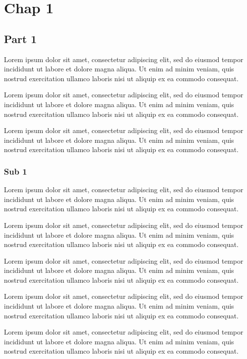 \documentclass[twoside]{report}
\begin{document}
\tableofcontents
\chapter{Chap 1}
\section{Part 1}
Lorem ipsum dolor sit amet, consectetur adipiscing elit, sed do eiusmod tempor incididunt ut labore et dolore magna aliqua. Ut enim ad minim veniam, quis nostrud exercitation ullamco laboris nisi ut aliquip ex ea commodo consequat.

Lorem ipsum dolor sit amet, consectetur adipiscing elit, sed do eiusmod tempor incididunt ut labore et dolore magna aliqua. Ut enim ad minim veniam, quis nostrud exercitation ullamco laboris nisi ut aliquip ex ea commodo consequat.

Lorem ipsum dolor sit amet, consectetur adipiscing elit, sed do eiusmod tempor incididunt ut labore et dolore magna aliqua. Ut enim ad minim veniam, quis nostrud exercitation ullamco laboris nisi ut aliquip ex ea commodo consequat.

\subsection{Sub 1}
Lorem ipsum dolor sit amet, consectetur adipiscing elit, sed do eiusmod tempor incididunt ut labore et dolore magna aliqua. Ut enim ad minim veniam, quis nostrud exercitation ullamco laboris nisi ut aliquip ex ea commodo consequat.

Lorem ipsum dolor sit amet, consectetur adipiscing elit, sed do eiusmod tempor incididunt ut labore et dolore magna aliqua. Ut enim ad minim veniam, quis nostrud exercitation ullamco laboris nisi ut aliquip ex ea commodo consequat.

Lorem ipsum dolor sit amet, consectetur adipiscing elit, sed do eiusmod tempor incididunt ut labore et dolore magna aliqua. Ut enim ad minim veniam, quis nostrud exercitation ullamco laboris nisi ut aliquip ex ea commodo consequat.

Lorem ipsum dolor sit amet, consectetur adipiscing elit, sed do eiusmod tempor incididunt ut labore et dolore magna aliqua. Ut enim ad minim veniam, quis nostrud exercitation ullamco laboris nisi ut aliquip ex ea commodo consequat.

Lorem ipsum dolor sit amet, consectetur adipiscing elit, sed do eiusmod tempor incididunt ut labore et dolore magna aliqua. Ut enim ad minim veniam, quis nostrud exercitation ullamco laboris nisi ut aliquip ex ea commodo consequat.
\end{document}
